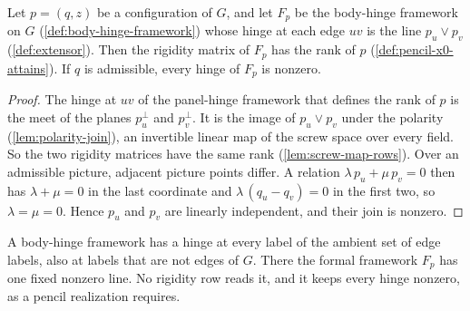 \begin{lemma}
  \label{lem:pencil-config-point-join-rank}
  \leanok
  Let $p = (q, z)$ be a configuration of $G$, and let $F_p$ be the
  body-hinge framework on $G$ (\cref{def:body-hinge-framework}) whose
  hinge at each edge $uv$ is the line $p_u \vee p_v$
  (\cref{def:extensor}). Then the rigidity matrix of $F_p$ has the rank
  of $p$ (\cref{def:pencil-x0-attains}). If $q$ is admissible, every
  hinge of $F_p$ is nonzero.
\end{lemma}
\begin{proof}
  \leanok
  The hinge at $uv$ of the panel-hinge framework that defines the rank
  of $p$ is the meet of the planes $p_u^{\perp}$ and $p_v^{\perp}$. It is
  the image of $p_u \vee p_v$ under the polarity
  (\cref{lem:polarity-join}), an invertible linear map of
  the screw space over every field. So the two rigidity matrices have the
  same rank (\cref{lem:screw-map-rows}). Over an admissible picture,
  adjacent picture points differ. A relation
  $\lambda\, p_u + \mu\, p_v = 0$ then has $\lambda + \mu = 0$ in the last
  coordinate and $\lambda\,(q_u - q_v) = 0$ in the first two, so
  $\lambda = \mu = 0$. Hence $p_u$ and $p_v$ are linearly independent,
  and their join is nonzero.
\end{proof}

\begin{fmlnote}
  \label{fmlnote:pencil-config-point-join-rank}
  A body-hinge framework has a hinge at every label of the ambient set
  of edge labels, also at labels that are not edges of $G$. There the
  formal framework $F_p$ has one fixed nonzero line. No rigidity row
  reads it, and it keeps every hinge nonzero, as a pencil realization
  requires.
\end{fmlnote}

